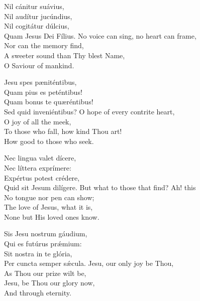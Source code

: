 
Nil cánitur suávius,\\
Nil audítur jucúndius,\\
Nil cogitátur dúlcius,\\
Quam Jesus Dei Fílius.
\divverse
No voice can sing, no heart can
frame,\\
Nor can the memory find,\\
A sweeter sound than Thy blest Name,\\
O Saviour of mankind.
\finishverse

Jesu spes pæniténtibus,\\
Quam pius es peténtibus!\\
Quam bonus te quæréntibus!\\
Sed quid inveniéntibus?
\divverse
O hope of every contrite heart,\\
O joy of all the meek,\\
To those who fall, how kind Thou art!\\
How good to those who seek.
\finishverse

Nec lingua valet dícere,\\
Nec líttera exprímere:\\
Expértus potest crédere,\\
Quid sit Jesum dilígere.
\divverse
But what to those that find? Ah! this\\
No tongue nor pen can show;\\
The love of Jesus, what it is,\\
None but His loved ones know.
\finishverse

Sis Jesu nostrum gáudium,\\
Qui es futúrus prǽmium:\\
Sit nostra in te glória,\\
Per cuncta semper sǽcula.
\divverse
Jesu, our only joy be Thou,\\
As Thou our prize wilt be,\\
Jesu, be Thou our glory now,\\
And through eternity.
\finishverse

\bigskip


